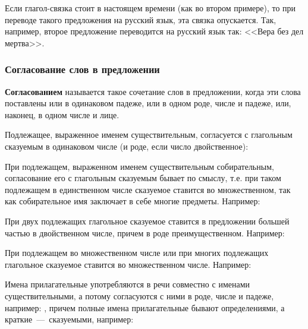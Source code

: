 \documentclass[11pt,a4paper,oneside]{memoir}
\begin{document}
    Если глагол-связка стоит в настоящем времени (как во втором примере), то при переводе такого предложения на русский язык, эта связка опускается. Так, например, второе предложение переводится на русский язык так: <<Вера без дел мертва>>.

                \subsubsection{Согласование слов в предложении}

    \textbf{Согласованием} называется такое сочетание слов в предложении, когда эти слова поставлены или в одинаковом падеже, или в одном роде, числе и падеже, или, наконец, в одном числе и лице.
    
    Подлежащее, выраженное именем существительным, согласуется с глагольным сказуемым в одинаковом числе (и роде, если число двойственное):
    
    \bigskip{}

    При подлежащем, выраженном именем существительным собирательным, согласование его с глагольным сказуемым бывает по смыслу, т.е. при таком подлежащем в единственном числе сказуемое ставится во множественном, так как собирательное имя заключает в себе многие предметы. Например:
    
    \bigskip{}

    При двух подлежащих глагольное сказуемое ставится в предложении большей частью в двойственном числе, причем в роде преимущественном. Например:
    
    \medskip{}

    При подлежащем во множественном числе или при многих подлежащих глагольное сказуемое ставится во множественном числе. Например:
        
    \bigskip{}

    Имена прилагательные употребляются в речи совместно с именами существительными, а потому согласуются с ними в роде, числе и падеже, например: {}, причем полные имена прилагательные бывают определениями, а краткие~---~сказуемыми, например:
        
\end{document}
